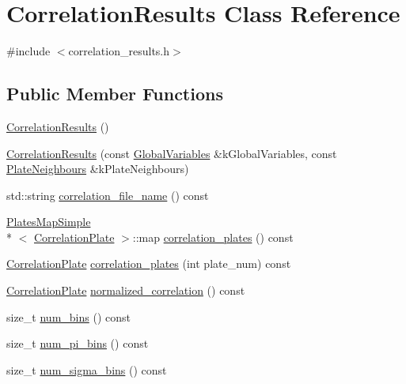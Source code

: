 \hypertarget{class_correlation_results}{\section{Correlation\-Results Class Reference}
\label{class_correlation_results}
}


{\ttfamily \#include $<$correlation\-\_\-results.\-h$>$}

\subsection*{Public Member Functions}
\begin{DoxyCompactItemize}
\item 
\hyperlink{class_correlation_results_a71efc304ebf89d8b0418d9ac88baac95}{Correlation\-Results} ()
\item 
\hyperlink{class_correlation_results_a423781178a3ddcb761c501acff5553ff}{Correlation\-Results} (const \hyperlink{class_global_variables}{Global\-Variables} \&k\-Global\-Variables, const \hyperlink{class_plate_neighbours}{Plate\-Neighbours} \&k\-Plate\-Neighbours)
\item 
std\-::string \hyperlink{class_correlation_results_a30bac33d879a65346831124367610148}{correlation\-\_\-file\-\_\-name} () const 
\item 
\hyperlink{struct_plates_map_simple}{Plates\-Map\-Simple}\\*
$<$ \hyperlink{class_correlation_plate}{Correlation\-Plate} $>$\-::map \hyperlink{class_correlation_results_afebc9131b5371056e7ba45aed92c67fc}{correlation\-\_\-plates} () const 
\item 
\hyperlink{class_correlation_plate}{Correlation\-Plate} \hyperlink{class_correlation_results_a671d48951a25f1086b6978e07d793920}{correlation\-\_\-plates} (int plate\-\_\-num) const 
\item 
\hyperlink{class_correlation_plate}{Correlation\-Plate} \hyperlink{class_correlation_results_a8c428a16d861076e768648f1bbf418cd}{normalized\-\_\-correlation} () const 
\item 
size\-\_\-t \hyperlink{class_correlation_results_a2cba363b6c6a959a65b4cd09568139b9}{num\-\_\-bins} () const 
\item 
size\-\_\-t \hyperlink{class_correlation_results_adf3ef279db5766a75fe31f8f8cd4bd14}{num\-\_\-pi\-\_\-bins} () const 
\item 
size\-\_\-t \hyperlink{class_correlation_results_ae6fbe4f8e750fdaaab5c3a7098bcd584}{num\-\_\-sigma\-\_\-bins} () const 

\end{DoxyCompactItemize}
